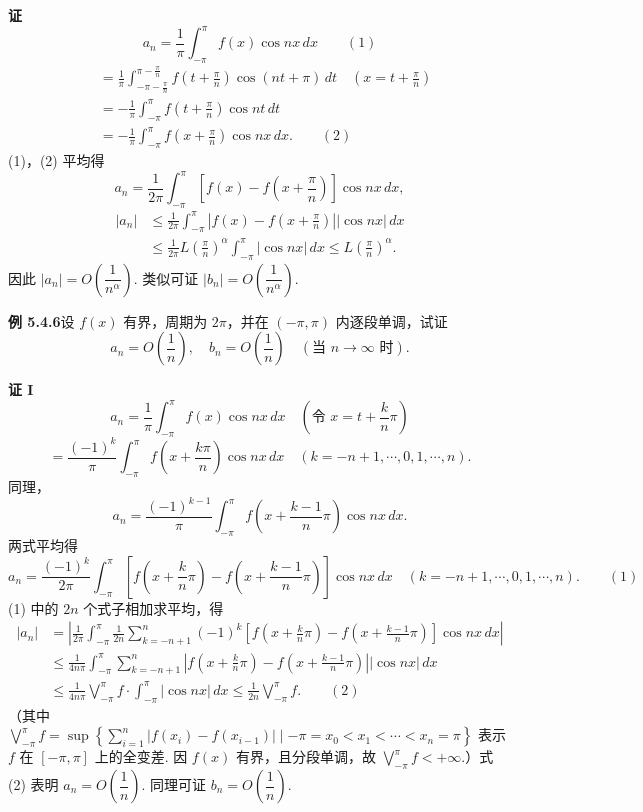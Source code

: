 \documentclass[UTF8, 12pt, fontset=fandol, oneside]{ctexart}
\begin{document}
\noindent\textbf{证}\quad
\[
  a_n=\frac1\pi\int_{-\pi}^{\pi}f(x)\cos nx\,dx \qquad(1)
\]
\[
\begin{aligned}
&=\frac1\pi\int_{-\pi-\frac\pi n}^{\pi-\frac\pi n}
  f\left(t+\frac\pi n\right)\cos(nt+\pi)\,dt
  \quad\left(x=t+\frac\pi n\right)\\
&=-\frac1\pi\int_{-\pi}^{\pi}f\left(t+\frac\pi n\right)\cos nt\,dt\\
&=-\frac1\pi\int_{-\pi}^{\pi}f\left(x+\frac\pi n\right)\cos nx\,dx. \qquad(2)
\end{aligned}
\]
(1)，(2) 平均得
\[
  a_n=\frac1{2\pi}\int_{-\pi}^{\pi}
  \left[f(x)-f\left(x+\frac\pi n\right)\right]\cos nx\,dx,
\]
\[
\begin{aligned}
|a_n|
&\le\frac1{2\pi}\int_{-\pi}^{\pi}
\left|f(x)-f\left(x+\frac\pi n\right)\right||\cos nx|\,dx\\
&\le\frac1{2\pi}L\left(\frac\pi n\right)^{\alpha}
\int_{-\pi}^{\pi}|\cos nx|\,dx
\le L\left(\frac\pi n\right)^{\alpha}.
\end{aligned}
\]
因此 $|a_n|=O\left(\dfrac1{n^\alpha}\right)$. 类似可证 $|b_n|=O\left(\dfrac1{n^\alpha}\right)$.

\noindent\textbf{例 5.4.6}\quad 设 $f(x)$ 有界，周期为 $2\pi$，并在 $(-\pi,\pi)$ 内逐段单调，试证
\[
  a_n=O\left(\frac1n\right),\quad b_n=O\left(\frac1n\right)\quad(\text{当 }n\to\infty\text{ 时}).
\]

\noindent\textbf{证 I}\quad
\[
  a_n=\frac1\pi\int_{-\pi}^{\pi}f(x)\cos nx\,dx
  \quad\left(\text{令 }x=t+\frac kn\pi\right)
\]
\[
  =\frac{(-1)^k}{\pi}\int_{-\pi}^{\pi}f\left(x+\frac{k\pi}n\right)\cos nx\,dx
  \quad(k=-n+1,\cdots,0,1,\cdots,n).
\]
同理，
\[
  a_n=\frac{(-1)^{k-1}}{\pi}\int_{-\pi}^{\pi}
  f\left(x+\frac{k-1}{n}\pi\right)\cos nx\,dx.
\]
两式平均得
\[
  a_n=\frac{(-1)^k}{2\pi}\int_{-\pi}^{\pi}
  \left[f\left(x+\frac kn\pi\right)-f\left(x+\frac{k-1}{n}\pi\right)\right]\cos nx\,dx
  \quad(k=-n+1,\cdots,0,1,\cdots,n). \qquad(1)
\]
(1) 中的 $2n$ 个式子相加求平均，得
\[
\begin{aligned}
|a_n|
&=\left|\frac1{2\pi}\int_{-\pi}^{\pi}\frac1{2n}
\sum_{k=-n+1}^{n}(-1)^k
\left[f\left(x+\frac kn\pi\right)-f\left(x+\frac{k-1}{n}\pi\right)\right]\cos nx\,dx\right|\\
&\le\frac1{4n\pi}\int_{-\pi}^{\pi}
\sum_{k=-n+1}^{n}\left|
f\left(x+\frac kn\pi\right)-f\left(x+\frac{k-1}{n}\pi\right)
\right||\cos nx|\,dx\\
&\le\frac1{4n\pi}\bigvee_{-\pi}^{\pi}f\cdot
\int_{-\pi}^{\pi}|\cos nx|\,dx
\le\frac1{2n}\bigvee_{-\pi}^{\pi}f. \qquad(2)
\end{aligned}
\]
（其中 $\displaystyle\bigvee_{-\pi}^{\pi}f=\sup\left\{\sum_{i=1}^{n}|f(x_i)-f(x_{i-1})|\mid -\pi=x_0<x_1<\cdots<x_n=\pi\right\}$ 表示 $f$ 在 $[-\pi,\pi]$ 上的全变差. 因 $f(x)$ 有界，且分段单调，故 $\displaystyle\bigvee_{-\pi}^{\pi}f<+\infty$.）式 (2) 表明 $a_n=O\left(\dfrac1n\right)$. 同理可证 $b_n=O\left(\dfrac1n\right)$.
\end{document}
